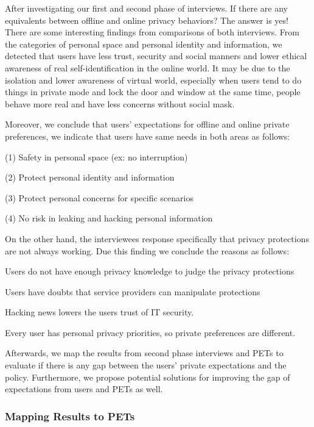 After investigating our first and second phase of interviews. If there are any equivalents between offline and online privacy behaviors? The answer is yes! There are some interesting findings from comparisons of both interviews. From the categories of personal space and personal identity and information, we detected that users have less trust, security and social manners and lower ethical awareness of real self-identification in the online world. It may be due to the isolation and lower awareness of virtual world, especially when users tend to do things in private mode and lock the door and window at the same time, people behave more real and have less concerns without social mask. 

Moreover, we conclude that users' expectations for offline and online private preferences, we indicate that users have same needs in both areas as follows: 

(1) Safety in personal space (ex: no interruption) 

(2) Protect personal identity and information 

(3) Protect personal concerns for specific scenarios 

(4) No risk in leaking and hacking personal information 

On the other hand, the interviewees response specifically that privacy protections are not always working. Due this finding we conclude the reasons as follows: 

Users do not have enough privacy knowledge to judge the privacy protections  

Users have doubts that service providers can manipulate protections 

Hacking news lowers the users trust of IT security.  

Every user has personal privacy priorities, so private preferences are different. 

Afterwards, we map the results from second phase interviews and PETs to evaluate if there is any gap between the users’ private expectations and the policy. Furthermore, we propose potential solutions for improving the gap of expectations from users and PETs as well. 

 
\subsubsection{Mapping Results to PETs}

